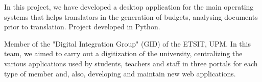 \documentclass[10pt,a4paper,ragged2e]{altacv}
\begin{document}

\begin{fullwidth}
\makecvheader
\end{fullwidth}




{In this project, we have developed a desktop application for the main operating systems that helps translators in the generation of budgets, analysing documents prior to translation. Project developed in Python.} 

\divider


{Member of the "Digital Integration Group" (GID) of the ETSIT, UPM. In this team, we aimed to carry out a digitization of the university, centralizing the various applications used by students, teachers and staff in three portals for each type of member and, also, developing and maintain new web applications.} 


\divider

\end{document}

